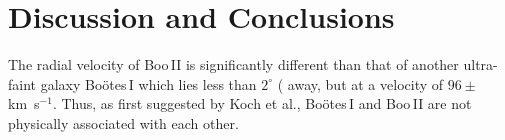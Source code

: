 \documentclass{../tex_files/emulateapj}
\newcommand{\kms}{\,km~s$^{-1}$}
\begin{document}
\section{Discussion and Conclusions}\label{sec_disc}

The radial velocity of Boo\,II
is significantly different than that of another ultra-faint galaxy
Bo\"otes\,I which lies less than $2^{\circ}$ ( away, but at a velocity of $96
\pm$\kms \citep{munoz06a}.  Thus, as first suggested by Koch et al.,
Bo\"otes\,I and Boo\,II are not physically associated with each other.



\acknowledgments














\clearpage
\end{document}
